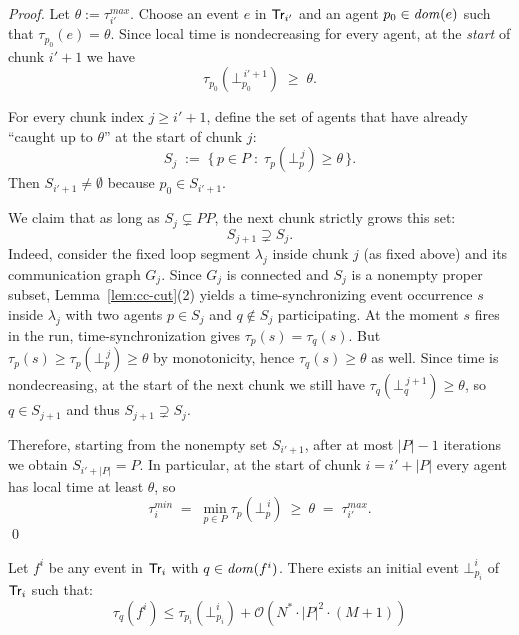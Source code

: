 \begin{proof}
Let $\theta := \tau^{max}_{i'}$. Choose an event $e$ in $\textsf{Tr}_{i'}$ and an agent $p_0\in\mathit{dom}(e)$ such that
$\tau_{p_0}(e)=\theta$.
Since local time is nondecreasing for every agent, at the \emph{start} of chunk $i'+1$ we have
\[
\tau_{p_0}(\bot^{\,i'+1}_{p_0}) \;\ge\; \theta.
\]

For every chunk index $j\ge i'+1$, define the set of agents that have already ``caught up to $\theta$'' at the start
of chunk $j$:
\[
S_j \;:=\; \{\, p\in P \;:\; \tau_p(\bot^{\,j}_p)\ge \theta \,\}.
\]
Then $S_{i'+1}\neq\emptyset$ because $p_0\in S_{i'+1}$.

We claim that as long as $S_j\subsetneq PP$, the next chunk strictly grows this set:
\[
S_{j+1}\supsetneq S_j.
\]
Indeed, consider the fixed loop segment $\lambda_j$ inside chunk $j$ (as fixed above) and its communication graph $G_j$.
Since $G_j$ is connected and $S_j$ is a nonempty proper subset, Lemma~\ref{lem:cc-cut}(2) yields a time-synchronizing
event occurrence $s$ inside $\lambda_j$ with two agents $p\in S_j$ and $q\notin S_j$ participating.
At the moment $s$ fires in the run, time-synchronization gives $\tau_p(s)=\tau_q(s)$.
But $\tau_p(s)\ge \tau_p(\bot^{\,j}_p)\ge \theta$ by monotonicity, hence $\tau_q(s)\ge \theta$ as well.
Since time is nondecreasing, at the start of the next chunk we still have $\tau_q(\bot^{\,j+1}_q)\ge \theta$,
so $q\in S_{j+1}$ and thus $S_{j+1}\supsetneq S_j$.

Therefore, starting from the nonempty set $S_{i'+1}$, after at most $|P|-1$ iterations we obtain
$S_{i'+|P|}=P$. In particular, at the start of chunk $i=i'+|P|$ every agent has local time at least $\theta$, so
\[
\tau^{min}_i \;=\; \min_{p\in P}\tau_p(\bot^{\,i}_p)\ \ge\ \theta \;=\; \tau^{max}_{i'}.
\]
\qed
\end{proof}

\begin{claim}\label{claim:within-chunk}
Let $f^i$ be any event in $\textsf{Tr}_i$ with $q \in \mathit{dom}(f^i)$. There exists an initial event $\bot^i_{p_i}$ of $\textsf{Tr}_i$ such that:
\[
\tau_q(f^i) \leq \tau_{p_i}(\bot^i_{p_i}) + \mathcal{O}(N^* \cdot |P|^2 \cdot (M+1))
\]
\end{claim}


